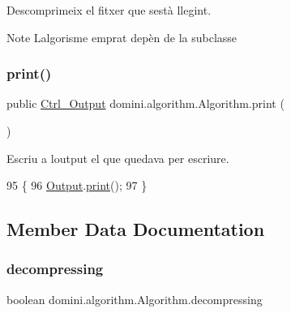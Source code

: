 Descomprimeix el fitxer que s\textquotesingle{}està llegint. 

\begin{DoxyNote}{Note}
L\textquotesingle{}algorisme emprat depèn de la subclasse 
\end{DoxyNote}
\mbox{\label{classdomini_1_1algorithm_1_1Algorithm_a5546f991f9d71d012d6ded5f2d4181cb}} 
\subsubsection{\texorpdfstring{print()}{print()}}
{\footnotesize\ttfamily public \hyperlink{classpersistencia_1_1output_1_1Ctrl__Output}{Ctrl\+\_\+\+Output} domini.\+algorithm.\+Algorithm.\+print (\begin{DoxyParamCaption}{ }\end{DoxyParamCaption})\hspace{0.3cm}{\ttfamily [inline]}}



Escriu a l\textquotesingle{}output el que quedava per escriure. 


\begin{DoxyCode}
95                         \{
96         \hyperlink{classdomini_1_1algorithm_1_1Algorithm_a4de9955411c656325adc391ef570c082}{Output}.\hyperlink{classpersistencia_1_1output_1_1Ctrl__Output_a908955c29bfecc7ebac86613bc75e9ed}{print}();
97     \}
\end{DoxyCode}


\subsection{Member Data Documentation}
\mbox{\label{classdomini_1_1algorithm_1_1Algorithm_a0ec73147fb68a16e53801ea5da35b089}} 
\subsubsection{\texorpdfstring{decompressing}{decompressing}}
{\footnotesize\ttfamily boolean domini.\+algorithm.\+Algorithm.\+decompressing\hspace{0.3cm}{\ttfamily [private]}}


